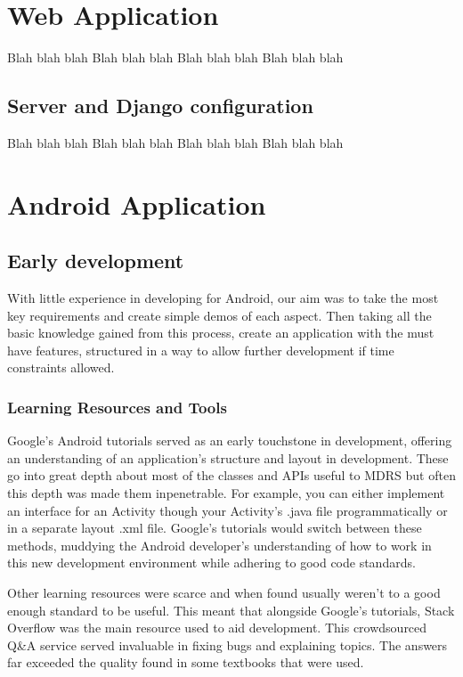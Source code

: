 \documentclass{l3proj}
\begin{document}
\section{Web Application}

Blah blah blah
Blah blah blah
Blah blah blah
Blah blah blah

\subsection{Server and Django configuration}

Blah blah blah
Blah blah blah
Blah blah blah
Blah blah blah

\section{Android Application}

\subsection{Early development} With little experience in developing for Android,
our aim was to take the most key requirements and create simple demos of each
aspect. Then taking all the basic knowledge gained from this process, create an
application with the must have features, structured in a way to allow further development if time constraints allowed.

\subsubsection{Learning Resources and Tools}
Google's Android tutorials served as an early touchstone in development, offering an understanding of an application's structure and layout in development. These go into great depth about most of the classes and APIs useful to MDRS but often this depth was made them inpenetrable. For example, you can either implement an interface for an Activity though your Activity's .java file programmatically or in a separate layout .xml file. Google's tutorials would switch between these methods, muddying the Android developer's understanding of how to work in this new development environment while adhering to good code standards.

Other learning resources were scarce and when found usually weren't to a good enough standard to be useful. This meant that alongside Google's tutorials, Stack Overflow was the main resource used to aid development. This crowdsourced Q&A service served invaluable in fixing bugs and explaining topics. The answers far exceeded the quality found in some textbooks that were used.
\end{document}
